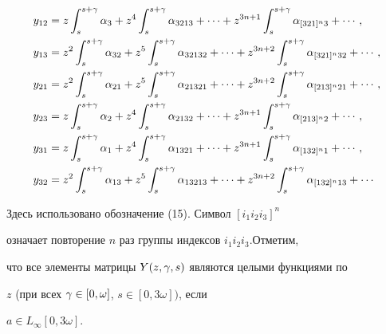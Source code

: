 \begin{equation}


\begin{split}


y_{12}&=z\int_s^{s+\g}\alpha_3+z^4\int_s^{s+\g}\alpha_{3213}+\dotsb


+z^{3n+1}\int_s^{s+\g}\alpha_{[321]^n3}+\dotsb,\\


%


y_{13}&=z^2\int_s^{s+\g}\alpha_{32}+z^5\int_s^{s+\g}\alpha_{32132}+\dotsb


+z^{3n+2}\int_s^{s+\g}\alpha_{[321]^n32}+\dotsb,\\


%


y_{21}&=z^2\int_s^{s+\g}\alpha_{21}+z^5\int_s^{s+\g}\alpha_{21321}+\dotsb


+z^{3n+2}\int_s^{s+\g}\alpha_{[213]^n21}+\dotsb,\\


%


y_{23}&=z\int_s^{s+\g}\alpha_{2}+z^4\int_s^{s+\g}\alpha_{2132}+\dotsb


+z^{3n+1}\int_s^{s+\g}\alpha_{[213]^n2}+\dotsb,\\


%


y_{31}&=z\int_s^{s+\g}\alpha_{1}+z^4\int_s^{s+\g}\alpha_{1321}+\dotsb


+z^{3n+1}\int_s^{s+\g}\alpha_{[132]^n1}+\dotsb,\\


%


y_{32}&=z^2\int_s^{s+\g}\alpha_{13}+z^5\int_s^{s+\g}\alpha_{13213}+\dotsb


+z^{3n+2}\int_s^{s+\g}\alpha_{[132]^n13}+\dotsb


\end{split}


\end{equation}


Здесь использовано обозначение (15). Символ $[i_1i_2i_3]^n$


означает повторение $n$ раз группы индексов $i_1i_2i_3$.Отметим,


что все элементы матрицы $Y(z,\gamma,s)$ являются целыми функциями по


$z$ (при всех $\gamma\in[0,\omega]$, $s\in[0,3\omega])$, если


$a\in L_\infty[0,3\omega]$.





